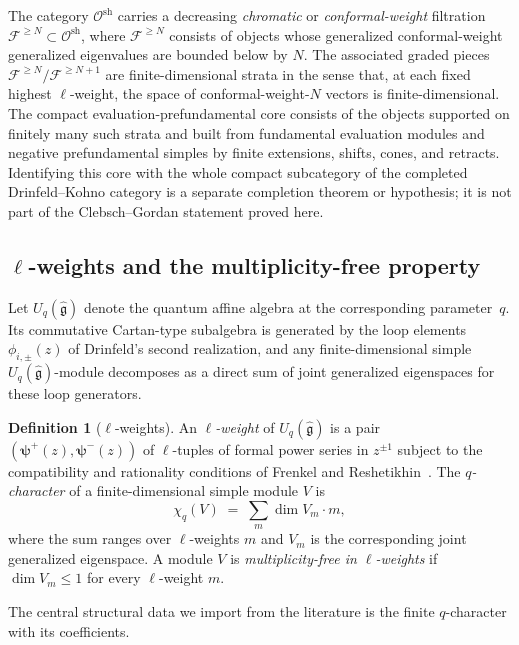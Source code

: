 \documentclass[11pt,reqno]{amsart}
\theoremstyle{definition}
\newtheorem{definition}[theorem]{Definition}
\theoremstyle{remark}
\providecommand{\cF}{\mathcal{F}}
\newcommand{\cO}{\mathcal{O}}
\newcommand{\fg}{\mathfrak{g}}
\newcommand{\Uq}{U_q(\hat{\fg})}
\numberwithin{equation}{section}
\begin{document}
The category $\cO^{\mathrm{sh}}$ carries a decreasing
\emph{chromatic} or \emph{conformal-weight} filtration
$\cF^{\geq N} \subset \cO^{\mathrm{sh}}$, where $\cF^{\geq N}$
consists of objects whose generalized conformal-weight generalized
eigenvalues are bounded below by $N$. The associated graded
pieces $\cF^{\geq N} / \cF^{\geq N+1}$ are finite-dimensional
strata in the sense that, at each fixed highest $\ell$-weight,
the space of conformal-weight-$N$ vectors is finite-dimensional.
The compact evaluation-prefundamental core consists of the objects
supported on finitely many such strata and built from fundamental
evaluation modules and negative prefundamental simples by finite
extensions, shifts, cones, and retracts. Identifying this core with
the whole compact subcategory of the completed Drinfeld--Kohno
category is a separate completion theorem or hypothesis; it is not
part of the Clebsch--Gordan statement proved here.

\subsection{$\ell$-weights and the multiplicity-free property}

Let $\Uq$ denote the quantum affine algebra at the corresponding
parameter~$q$. Its commutative Cartan-type subalgebra is generated
by the loop elements $\phi_{i,\pm}(z)$ of Drinfeld's second
realization, and any finite-dimensional simple $\Uq$-module
decomposes as a direct sum of joint generalized eigenspaces for
these loop generators.

\begin{definition}[$\ell$-weights]
\label{def:l-weight}
An \emph{$\ell$-weight} of $\Uq$ is a pair
$(\boldsymbol{\psi}^+(z), \boldsymbol{\psi}^-(z))$ of
$\ell$-tuples of formal power series in $z^{\pm 1}$ subject to
the compatibility and rationality conditions of Frenkel and
Reshetikhin~\cite{FR99}. The \emph{$q$-character} of a
finite-dimensional simple module $V$ is
\[
\chi_q(V)
 \;=\;
 \sum_{m} \dim V_m \cdot m,
\]
where the sum ranges over $\ell$-weights $m$ and $V_m$ is the
corresponding joint generalized eigenspace. A module $V$ is
\emph{multiplicity-free in $\ell$-weights} if $\dim V_m \leq 1$
for every $\ell$-weight $m$.
\end{definition}

The central structural data we import from the literature is the
finite $q$-character with its coefficients.
\end{document}
